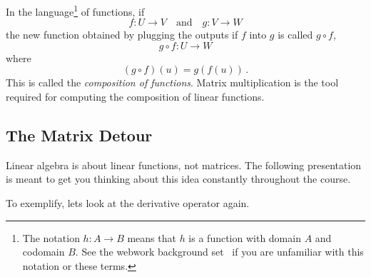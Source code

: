 In the language\footnote{The notation $h:A\to B$ means that $h$ is a function with domain $A$ and codomain $B$. See the webwork  background  set~ if you are unfamiliar with this notation or these terms.} 
of functions, if \[f:U\longrightarrow V\quad \mbox{and}\quad g:V\longrightarrow W\]
the new function obtained by plugging the outputs if $f$ into $g$ is called $g\circ f$,
\[
g\circ f:
U\longrightarrow  W\]
where
\[
(g\circ f)(u)=g(f(u))\, .
\]
This is called the {\itshape composition of functions}.
Matrix multiplication is the tool required for computing the composition of linear functions.


\subsection{The Matrix Detour}
Linear algebra is about linear functions, not matrices. 
The following presentation is meant to get you thinking about this idea constantly throughout the course.
\begin{center}
\end{center}
To exemplify, lets look at the derivative operator again.

